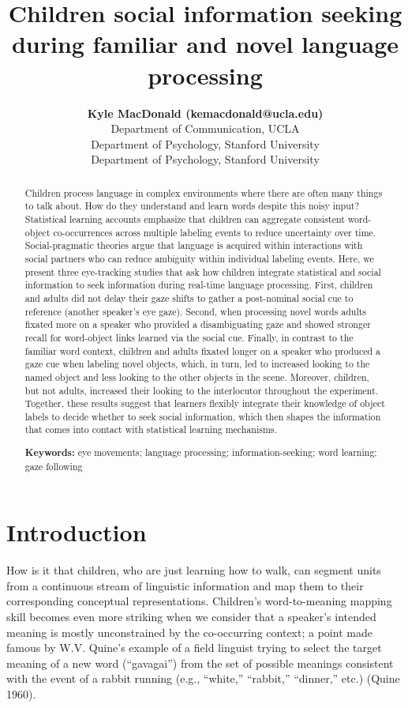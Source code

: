 \documentclass[10pt, letterpaper]{article}
\title{Children social information seeking during familiar and novel language
processing}
\author{{\large \bf Kyle MacDonald (kemacdonald@ucla.edu)} \\ Department of Communication, UCLA  \AND {\large \bf Elizabeth Swanson (elizswan@stanford.edu)} \\ Department of Psychology, Stanford University  \AND {\large \bf Michael C. Frank (mcfrank@stanford.edu)} \\ Department of Psychology, Stanford University  }
\begin{document}
\maketitle

\begin{abstract}
Children process language in complex environments where there are often
many things to talk about. How do they understand and learn words
despite this noisy input? Statistical learning accounts emphasize that
children can aggregate consistent word-object co-occurrences across
multiple labeling events to reduce uncertainty over time.
Social-pragmatic theories argue that language is acquired within
interactions with social partners who can reduce ambiguity within
individual labeling events. Here, we present three eye-tracking studies
that ask how children integrate statistical and social information to
seek information during real-time language processing. First, children
and adults did not delay their gaze shifts to gather a post-nominal
social cue to reference (another speaker's eye gaze). Second, when
processing novel words adults fixated more on a speaker who provided a
disambiguating gaze and showed stronger recall for word-object links
learned via the social cue. Finally, in contrast to the familiar word
context, children and adults fixated longer on a speaker who produced a
gaze cue when labeling novel objects, which, in turn, led to increased
looking to the named object and less looking to the other objects in the
scene. Moreover, children, but not adults, increased their looking to
the interlocutor throughout the experiment. Together, these results
suggest that learners flexibly integrate their knowledge of object
labels to decide whether to seek social information, which then shapes
the information that comes into contact with statistical learning
mechanisms.

\textbf{Keywords:}
eye movements; language processing; information-seeking; word learning;
gaze following
\end{abstract}

\hypertarget{introduction}{%
\section{Introduction}\label{introduction}}

How is it that children, who are just learning how to walk, can segment
units from a continuous stream of linguistic information and map them to
their corresponding conceptual representations. Children's
word-to-meaning mapping skill becomes even more striking when we
consider that a speaker's intended meaning is mostly unconstrained by
the co-occurring context; a point made famous by W.V. Quine's example of
a field linguist trying to select the target meaning of a new word
(``gavagai'') from the set of possible meanings consistent with the
event of a rabbit running (e.g., ``white,'' ``rabbit,'' ``dinner,''
etc.) (Quine 1960).
\end{document}
